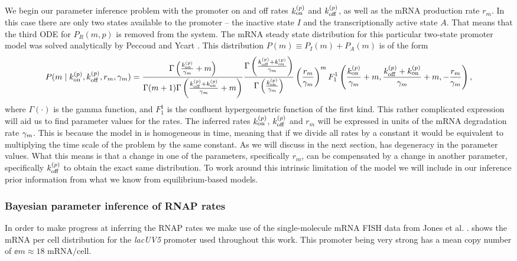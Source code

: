 We begin our parameter inference problem with the promoter on and off rates
$k^{(p)}_{\text{on}}$ and $k^{(p)}_{\text{off}}$, as well as the mRNA production rate $r_m$. In this case
there are only two states available to the promoter -- the inactive state $I$
and the transcriptionally active  state $A$. That means that the third ODE for
$P_R(m, p)$ is removed from the system. The mRNA steady state distribution for
this particular two-state promoter model was solved analytically by Peccoud and
Ycart \cite{Peccoud1995}. This distribution $P(m) \equiv P_I(m) + P_A(m)$ is of
the form
\begin{equation}
  \small
  P(m \mid k^{(p)}_{\text{on}}, k^{(p)}_{\text{off}}, r_m, \gamma _m) =
  {\Gamma \left( \frac{k^{(p)}_{\text{on}}}{\gamma _m} + m \right) \over
  \Gamma(m + 1) \Gamma\left( \frac{k^{(p)}_{\text{off}}+k^{(p)}_{\text{on}}}{\gamma _m} + m \right)}
  {\Gamma\left( \frac{k^{(p)}_{\text{off}}+k^{(p)}_{\text{on}}}{\gamma _m} \right) \over
  \Gamma\left( \frac{k^{(p)}_{\text{on}}}{\gamma _m} \right)}
  \left( {r_m \over \gamma _m} \right)^m
  F_1^1 \left( {k^{(p)}_{\text{on}} \over \gamma _m} + m,
  {k^{(p)}_{\text{off}} + k^{(p)}_{\text{on}} \over \gamma _m} + m,
  -{r_m \over \gamma _m} \right),
  \label{seq_two_state_mRNA}
\end{equation}
where $\Gamma(\cdot)$ is the gamma function, and $F_1^1$ is the confluent
hypergeometric function of the first kind. This rather complicated expression
will aid us to find parameter values for the rates. The inferred rates $k^{(p)}_{\text{on}}$,
$k^{(p)}_{\text{off}}$ and $r_m$ will be expressed in units of the mRNA degradation rate
$\gamma _m$. This is because the model in  is homogeneous in
time, meaning that if we divide all rates by a constant it would be equivalent
to multiplying the time scale of the problem by the same constant. As we will
discuss in the next section,  has degeneracy in the
parameter values. What this means is that a change in one of the parameters,
specifically $r_m$, can be compensated by a change in another parameter,
specifically $k^{(p)}_{\text{off}}$ to obtain the exact same distribution. To work around this
intrinsic limitation of the model we will include in our inference prior
information from what we know from equilibrium-based models.

\subsubsection*{Bayesian parameter inference of RNAP rates}

In order to make progress at inferring the RNAP rates we make use of the
single-molecule mRNA FISH data from Jones et al. \cite{Jones2014a}.
 shows the mRNA per cell distribution for the
\textit{lacUV5} promoter used throughout this work. This promoter being very
strong has a mean copy number of $\ee{m} \approx 18$ mRNA/cell.

